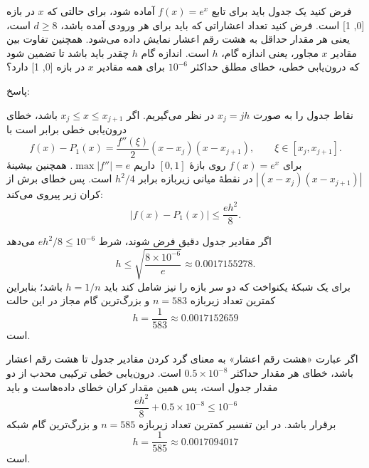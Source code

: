 فرض کنید یک جدول باید برای تابع 
\(f (x) = e^{x}\)
آماده شود، برای حالتی که 
\(x\)
در بازه [0, 1] است.
فرض کنید تعداد اعشاراتی که باید برای هر ورودی آمده باشد، 
\(d \geq 8\)
است، یعنی هر مقدار حداقل به هشت رقم اعشار نمایش داده می‌شود.
همچنین تفاوت بین مقادیر 
\(x\)
مجاور، یعنی اندازه گام، 
\(h\)
است. اندازه گام 
\(h\)
چقدر باید باشد تا تضمین شود که درون‌یابی خطی، خطای مطلق حداکثر 
\(10^{-6}\)
برای همه مقادیر
\(x\)
در بازه [0, 1] دارد؟

پاسخ:

نقاط جدول را به صورت
\(x_j=jh\)
در نظر می‌گیریم. اگر
\(x_j\leq x\leq x_{j+1}\)
باشد، خطای درون‌یابی خطی برابر است با
\[
 f(x)-P_1(x)=\frac{f''(\xi)}{2}(x-x_j)(x-x_{j+1}),
 \qquad \xi\in[x_j,x_{j+1}].
\]
برای
\(f(x)=e^x\)
روی بازهٔ
\([0,1]\)
داریم
\(\max |f''|=e\).
همچنین بیشینهٔ
\(\left|(x-x_j)(x-x_{j+1})\right|\)
در نقطهٔ میانی زیر‌بازه برابر
\(h^2/4\)
است. پس خطای برش از کران زیر پیروی می‌کند:
\[
 |f(x)-P_1(x)|\leq\frac{eh^2}{8}.
\]

اگر مقادیر جدول دقیق فرض شوند، شرط
\(eh^2/8\leq10^{-6}\)
می‌دهد
\[
 h\leq\sqrt{\frac{8\times10^{-6}}{e}}
 \approx0.0017155278.
\]
برای یک شبکهٔ یکنواخت که دو سر بازه را نیز شامل کند باید
\(h=1/n\)
باشد؛ بنابراین کمترین تعداد زیر‌بازه
\(n=583\)
و بزرگ‌ترین گام مجاز در این حالت
\[
 h=\frac{1}{583}\approx0.0017152659
\]
است.

اگر عبارت «هشت رقم اعشار» به معنای گرد کردن مقادیر جدول تا هشت رقم اعشار باشد، خطای هر مقدار حداکثر
\(0.5\times10^{-8}\)
است. درون‌یابی خطی ترکیبی محدب از دو مقدار جدول است، پس همین مقدار کران خطای داده‌هاست و باید
\[
 \frac{eh^2}{8}+0.5\times10^{-8}\leq10^{-6}
\]
برقرار باشد. در این تفسیر کمترین تعداد زیر‌بازه
\(n=585\)
و بزرگ‌ترین گام شبکه
\[
 \boxed{h=\frac{1}{585}\approx0.0017094017}
\]
است.
